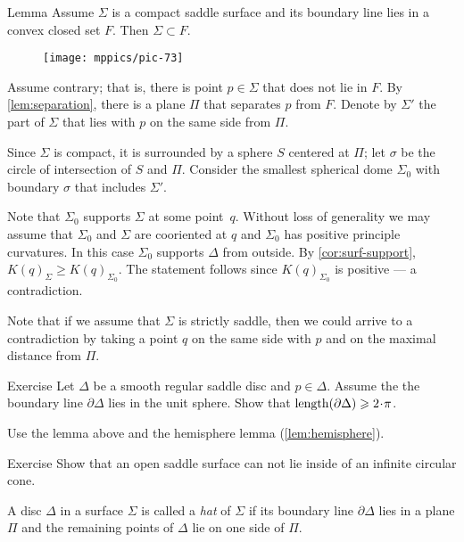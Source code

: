 \begin{thm}{Lemma}\label{lem:convex-saddle}
Assume $\Sigma$ is a compact saddle surface and its boundary line lies in a convex closed set $F$.
Then $\Sigma\subset F$.
\end{thm}

\begin{wrapfigure}{o}{50 mm}
\vskip-0mm
\centering
\texttt{[image: mppics/pic-73]}
\vskip0mm
\end{wrapfigure}

Assume contrary; that is, there is point $p\in \Sigma$ that does not lie in $F$.
By \ref{lem:separation}, there is a plane $\Pi$ that separates $p$ from $F$.
Denote by $\Sigma'$ the part of $\Sigma$ that lies with $p$ on the same side from $\Pi$.

Since $\Sigma$ is compact, it is surrounded by a sphere $S$ centered at $\Pi$;
let $\sigma$ be the circle of intersection of $S$ and $\Pi$.
Consider the smallest spherical dome $\Sigma_0$ with boundary $\sigma$ that includes $\Sigma'$.

Note that $\Sigma_0$ supports $\Sigma$ at some point~$q$.
Without loss of generality we may assume that $\Sigma_0$ and $\Sigma$ are cooriented at $q$ and $\Sigma_0$ has positive principle curvatures.
In this case $\Sigma_0$ supports $\Delta$ from outside.
By \ref{cor:surf-support}, $K(q)_\Sigma\ge K(q)_{\Sigma_0}$.
The statement follows since $K(q)_{\Sigma_0}$ is positive --- a contradiction.
\qeds

Note that if we assume that $\Sigma$ is strictly saddle, then we could arrive to a contradiction by taking a point $q$ on the same side with $p$ and on the maximal distance from $\Pi$.

\begin{thm}{Exercise}\label{ex:length-of-bry}
Let $\Delta$ be a smooth regular saddle disc and $p\in \Delta$.
Assume the the boundary line $\partial \Delta$ lies in the unit sphere.
Show that $\length (\partial \Delta)\ge 2\cdot\pi$.
\end{thm}

 Use the lemma above and the hemisphere lemma (\ref{lem:hemisphere}).

\begin{thm}{Exercise}\label{ex:circular-cone-saddle}
Show that an open saddle surface
can not lie inside of an infinite circular cone. 
\end{thm}

A disc $\Delta$ in a surface $\Sigma$ is called a \emph{hat} of $\Sigma$
if its boundary line $\partial\Delta$ lies in a plane $\Pi$ and the remaining points of $\Delta$ lie on one side of $\Pi$.

